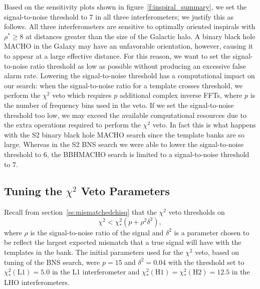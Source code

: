 Based on the sensitivity plots shown in figure~\ref{f:inspiral_summary}, we
set the signal-to-noise threshold to $7$ in all three interferometers; we
justify this as follows. All three interferometers are sensitive to optimally
oriented inspirals with $\rho^\ast \ge 8$ at distances greater than the size
of the Galactic halo. A binary black hole MACHO in the Galaxy may have an
unfavorable orientation, however, causing it to appear at a large effective
distance.  For this reason, we want to set the signal-to-noise ratio threshold
as low as possible without producing an excessive false alarm rate. Lowering
the signal-to-noise threshold has a computational impact on our search:
when the signal-to-noise ratio for a template crosses threshold, we
perform the $\chi^2$ veto which requires $p$ additional complex inverse FFTs,
where $p$ is the number of frequency bins used in the veto. If we set the
signal-to-noise threshold too low, we may exceed the available computational
resources due to the extra operations required to perform the $\chi^2$ veto.
In fact this is what happens with the S2 binary black hole MACHO search since
the template banks are so large. Whereas in the S2 BNS search we were able to
lower the signal-to-noise threshold to $6$, the BBHMACHO search is limited to
a signal-to-noise threshold to $7$.

\subsection{Tuning the $\chi^2$ Veto Parameters}
\label{ss:chisqtuning}


Recall from section~\ref{ss:mismatchedchisq} that the $\chi^2$ veto thresholds
on
\begin{equation}
\chi^2 < \chi^2_\ast (p+\rho^2 \delta^2),
\label{eq:chisqthreshold2}
\end{equation}
where $\rho$ is the signal-to-noise ratio of the signal and $\delta^2$ is a
parameter chosen to be reflect the largest expected mismatch that a true
signal will have with the templates in the bank. The initial parameters used
for the $\chi^2$ veto, based on tuning of the BNS search, were $p = 15$ and
$\delta^2 = 0.04$ with the threshold set to $\chi^2_\ast(\mathrm{L1}) = 5.0$ in
the L1 interferometer and $\chi^2_\ast(\mathrm{H1}) = \chi^2_\ast(\mathrm{H2}) =
12.5$ in the LHO interferometers.

